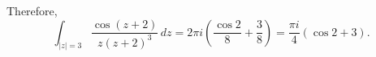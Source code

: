 \documentclass[12pt]{exam}
\begin{document}
\begin{questions}
\begin{parts}
\begin{solution}
    Therefore,
    \[
        \int_{|z|=3}\frac{\cos(z+2)}{z(z+2)^3}\,dz = 2\pi i\left(\frac{\cos 2}8 + \frac38\right) = \frac{\pi i}4(\cos 2 + 3).
    \]
\end{solution}
    
\end{parts}

\end{questions}
\end{document}
